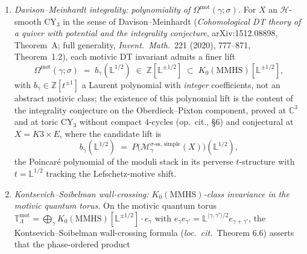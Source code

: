 \begin{conjecture}
\begin{enumerate}[label=\textup{(\roman*)},leftmargin=1.5em]
\[ \;\in\; K_0(\mathrm{MMHS})[\mathbb L^{\pm 1/2}]\bigl[\!\bigl[ q^{N_\bullet(X)} \bigr]\!\bigr].
 \]
 Under the identification $q^\gamma \mapsto q^n \zeta^{\beta_h} p^{d-1}$ fixed by the K3-fibre/base decomposition $N_\bullet(X) \cong \mathbb Z \oplus H^2(K3, \mathbb Z) \oplus \mathbb Z$, the Euler specialisation equals the Oberdieck partition function
 \[
 \chi\bigl(Z^{\mathrm{mot}}_{X, \sigma}(q)\bigr)
 \;=\;
 -\frac{C^{\mathrm{OP}}(q,\zeta,p)}
 {\Phi_{10}^{\mathrm{OP}}(q, \zeta, p)},
\]
 with $\Phi_{10}^{\mathrm{OP}}=D_5^2=4096^{-1}\Delta_5^{\,2}$ and $C^{\mathrm{OP}}=4096^{-1}C$ the same Oberdieck numerator in the OP scalar normalisation (Theorem~\ref{thm:qgf-motivic-dt-coha-phi3-gDelta5}). With the numerator suppressed this is the scalar identity $-(\Phi_{10}^{\mathrm{OP}})^{-1}=-4096\,\Delta_5^{-2}$.
 \item \emph{Davison--Meinhardt integrality: polynomiality of $\Omega^{\mathrm{mot}}(\gamma; \sigma)$.} For $X$ an $\mathcal H$-smooth CY$_3$ in the sense of Davison--Meinhardt (\emph{Cohomological DT theory of a quiver with potential and the integrality conjecture}, arXiv:1512.08898, Theorem~A; full generality, \emph{Invent.\ Math.}\ 221 (2020), 777--871, Theorem~1.2), each motivic DT invariant admits a finer lift
 \[
 \Omega^{\mathrm{mot}}(\gamma; \sigma) \;=\; b_\gamma(\mathbb L^{1/2})
 \;\in\; \mathbb Z[\mathbb L^{\pm 1/2}] \;\subset\; K_0(\mathrm{MMHS})[\mathbb L^{\pm 1/2}],
 \]
 with $b_\gamma \in \mathbb Z[t^{\pm 1}]$ a Laurent polynomial with \emph{integer} coefficients, not an abstract motivic class; the existence of this polynomial lift is the content of the integrality conjecture on the Oberdieck--Pixton component, proved at $\mathbb C^3$ and at toric CY$_3$ without compact $4$-cycles (op.\ cit., \S 6) and conjectural at $X = K3 \times E$, where the candidate lift is
 \[
 b_\gamma(\mathbb L^{1/2}) \;=\; P\bigl(\mathcal M_\gamma^{\sigma\text{-ss, simple}}(X)\bigr)(\mathbb L^{1/2}),
 \]
 the Poincar\'e polynomial of the moduli stack in its perverse $t$-structure with $t = \mathbb L^{1/2}$ tracking the Lefschetz-motive shift.
 \item \emph{Kontsevich--Soibelman wall-crossing: $K_0(\mathrm{MMHS})$-class invariance in the motivic quantum torus.} On the motivic quantum torus $\mathbb T_\Lambda^{\mathrm{mot}} = \bigoplus_\gamma K_0(\mathrm{MMHS})[\mathbb L^{\pm 1/2}] \cdot e_\gamma$ with $e_\gamma e_{\gamma'} = \mathbb L^{\langle \gamma, \gamma' \rangle / 2} e_{\gamma + \gamma'}$, the Kontsevich--Soibelman wall-crossing formula (\emph{loc.\ cit.}\ Theorem 6.6) asserts that the phase-ordered product

\end{enumerate}
\end{conjecture}
